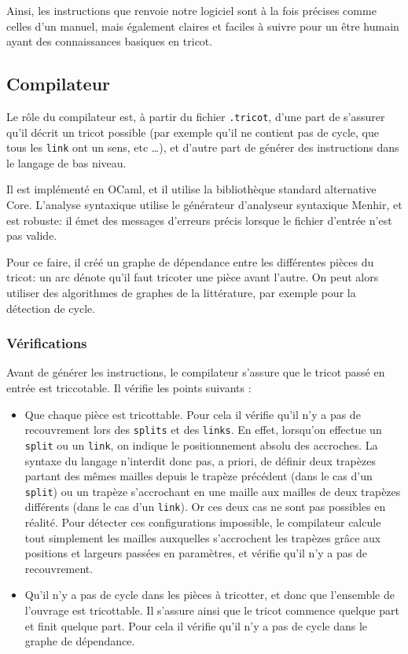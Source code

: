 \documentclass{article}
\begin{document}

Ainsi, les instructions que renvoie notre logiciel sont à la fois précises comme celles d'un manuel, mais 
également claires et faciles à suivre pour un être humain ayant des connaissances basiques en tricot. 

\subsection{Compilateur} %

Le rôle du compilateur est, à partir du fichier \texttt{.tricot}, d'une part de 
s'assurer qu'il décrit un tricot possible (par exemple qu'il ne contient
pas de cycle, que tous les \texttt{link} ont un sens, etc \dots), et 
d'autre part de générer des instructions  dans le langage de bas niveau.

Il est implémenté en OCaml, et il utilise la bibliothèque standard alternative
Core. L'analyse syntaxique utilise le générateur d'analyseur syntaxique Menhir,
et est robuste: il émet des messages d'erreurs précis lorsque le fichier d'entrée 
n'est pas valide.

Pour ce faire, il créé un graphe de dépendance entre les différentes pièces
du tricot: un arc dénote qu'il faut tricoter une pièce avant l'autre. On peut
alors utiliser des algorithmes de graphes de la littérature, par exemple pour 
la détection de cycle.

\subsubsection{Vérifications}

Avant de générer les instructions, le compilateur s'assure que le tricot passé en entrée est triccotable. Il vérifie les points suivants :
\begin{itemize}
 \item Que chaque pièce est tricottable. Pour cela il vérifie qu'il n'y a pas de recouvrement lors des \texttt{splits} et des \texttt{links}. En effet, lorsqu'on effectue un \texttt{split} ou un \texttt{link}, on indique le positionnement absolu des accroches. La syntaxe du langage n'interdit donc pas, a priori, de définir deux trapèzes partant des mêmes mailles depuis le trapèze précédent (dans le cas d'un \texttt{split}) ou un trapèze s'accrochant en une maille aux mailles de deux trapèzes différents (dans le cas d'un \texttt{link}). Or ces deux cas ne sont pas possibles en réalité. Pour détecter ces configurations impossible, le compilateur calcule tout simplement les mailles auxquelles s'accrochent les trapèzes grâce aux positions et largeurs passées en paramètres, et vérifie qu'il n'y a pas de recouvrement.
 \item Qu'il n'y a pas de cycle dans les pièces à tricotter, et donc que l'ensemble de l'ouvrage est tricottable. Il s'assure ainsi que le tricot commence quelque part et finit quelque part. Pour cela il vérifie qu'il n'y a pas de cycle dans le graphe de dépendance.
\end{itemize}
\end{document}
